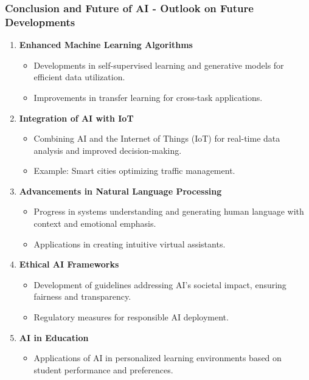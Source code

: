 \documentclass[aspectratio=169]{beamer}
\begin{document}
\begin{frame}[fragile]
    \frametitle{Conclusion and Future of AI - Outlook on Future Developments}
    
    \begin{enumerate}
        \item \textbf{Enhanced Machine Learning Algorithms}
            \begin{itemize}
                \item Developments in self-supervised learning and generative models for efficient data utilization.
                \item Improvements in transfer learning for cross-task applications.
            \end{itemize}
        
        \item \textbf{Integration of AI with IoT}
            \begin{itemize}
                \item Combining AI and the Internet of Things (IoT) for real-time data analysis and improved decision-making. 
                \item Example: Smart cities optimizing traffic management.
            \end{itemize}
        
        \item \textbf{Advancements in Natural Language Processing}
            \begin{itemize}
                \item Progress in systems understanding and generating human language with context and emotional emphasis.
                \item Applications in creating intuitive virtual assistants.
            \end{itemize}
        
        \item \textbf{Ethical AI Frameworks}
            \begin{itemize}
                \item Development of guidelines addressing AI's societal impact, ensuring fairness and transparency.
                \item Regulatory measures for responsible AI deployment.
            \end{itemize}
        
        \item \textbf{AI in Education}
            \begin{itemize}
                \item Applications of AI in personalized learning environments based on student performance and preferences.
            \end{itemize}
    \end{enumerate}
\end{frame}
\end{document}
